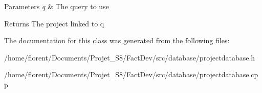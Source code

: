 \begin{DoxyParams}{Parameters}
{\em q} & The query to use \\
\hline
\end{DoxyParams}
\begin{DoxyReturn}{Returns}
The project linked to q 
\end{DoxyReturn}


The documentation for this class was generated from the following files\-:\begin{DoxyCompactItemize}
\item 
/home/florent/\-Documents/\-Projet\-\_\-\-S8/\-Fact\-Dev/src/database/projectdatabase.\-h\item 
/home/florent/\-Documents/\-Projet\-\_\-\-S8/\-Fact\-Dev/src/database/projectdatabase.\-cpp\end{DoxyCompactItemize}
